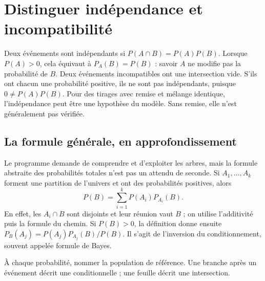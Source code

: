 \documentclass[../cours_2de.tex]{subfiles}
\begin{document}
\section{Distinguer indépendance et incompatibilité}
\approfondissement Deux événements sont indépendants si $P(A\cap B)=P(A)P(B)$.
Lorsque $P(A)>0$, cela équivaut à $P_A(B)=P(B)$ : savoir $A$ ne modifie pas la probabilité de $B$.
Deux événements incompatibles ont une intersection vide. S'ils ont chacun une probabilité positive, ils ne sont pas indépendants, puisque $0\ne P(A)P(B)$.
Pour des tirages avec remise et mélange identique, l'indépendance peut être une hypothèse du modèle. Sans remise, elle n'est généralement pas vérifiée.
\begin{finchapitre}
\section{La formule générale, en approfondissement}
Le programme demande de comprendre et d'exploiter les arbres, mais la formule abstraite des probabilités totales n'est pas un attendu de seconde.
\approfondissement Si $A_1,\ldots,A_k$ forment une partition de l'univers et ont des probabilités positives, alors
\[
P(B)=\sum_{i=1}^k P(A_i)P_{A_i}(B).
\]
En effet, les $A_i\cap B$ sont disjoints et leur réunion vaut $B$ ; on utilise l'additivité puis la formule du chemin.
Si $P(B)>0$, la définition donne ensuite
$P_B(A_j)=P(A_j)P_{A_j}(B)/P(B)$.
Il s'agit de l'inversion du conditionnement, souvent appelée formule de Bayes.
\begin{retenir}
À chaque probabilité, nommer la population de référence. Une branche après un événement décrit une conditionnelle ; une feuille décrit une intersection.
\end{retenir}
\end{finchapitre}
\end{document}
